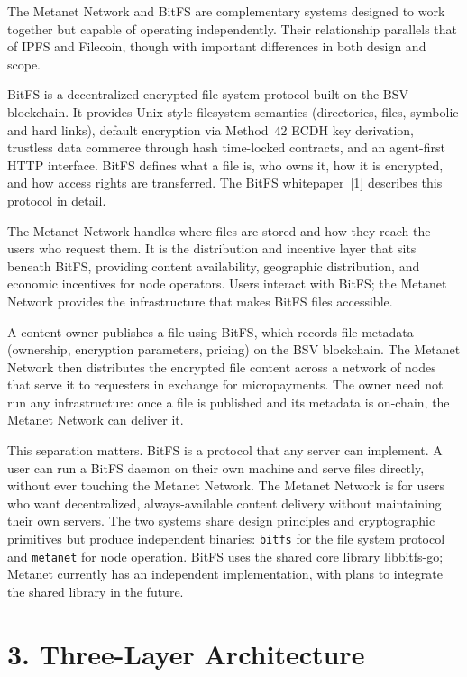 \documentclass[11pt,a4paper]{article}
\begin{document}
The Metanet Network and BitFS are complementary systems designed to work together but capable of operating independently. Their relationship parallels that of IPFS and Filecoin, though with important differences in both design and scope.

BitFS is a decentralized encrypted file system protocol built on the BSV blockchain. It provides Unix-style filesystem semantics (directories, files, symbolic and hard links), default encryption via Method~42 ECDH key derivation, trustless data commerce through hash time-locked contracts, and an agent-first HTTP interface. BitFS defines what a file is, who owns it, how it is encrypted, and how access rights are transferred. The BitFS whitepaper~[1] describes this protocol in detail.

The Metanet Network handles where files are stored and how they reach the users who request them. It is the distribution and incentive layer that sits beneath BitFS, providing content availability, geographic distribution, and economic incentives for node operators. Users interact with BitFS; the Metanet Network provides the infrastructure that makes BitFS files accessible.

A content owner publishes a file using BitFS, which records file metadata (ownership, encryption parameters, pricing) on the BSV blockchain. The Metanet Network then distributes the encrypted file content across a network of nodes that serve it to requesters in exchange for micropayments. The owner need not run any infrastructure: once a file is published and its metadata is on-chain, the Metanet Network can deliver it.

This separation matters. BitFS is a protocol that any server can implement. A user can run a BitFS daemon on their own machine and serve files directly, without ever touching the Metanet Network. The Metanet Network is for users who want decentralized, always-available content delivery without maintaining their own servers. The two systems share design principles and cryptographic primitives but produce independent binaries: \texttt{bitfs} for the file system protocol and \texttt{metanet} for node operation. BitFS uses the shared core library libbitfs-go; Metanet currently has an independent implementation, with plans to integrate the shared library in the future.

\section{3. Three-Layer Architecture}
\end{document}
